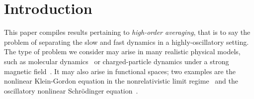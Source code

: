 













\section{Introduction}
\label{section:introduction}


This paper compiles results pertaining to \textit{high-order averaging},
that is to say the problem of separating the slow and fast dynamics in a
highly-oscillatory setting. The type of problem we consider may arise in
many realistic physical models, such as molecular
dynamics~\cite{garciaarchilla.1998.long} or charged-particle dynamics under a
strong magnetic field~\cite{chartier.2020.uniformly,
frenod.2009.long,frenod.2000.long}. It may also arise in functional
spaces; two examples are the nonlinear Klein-Gordon equation in the
nonrelativistic limit regime~\cite{bao.2014.uniformly,
bao.2019.comparison, chartier.2020.new} and the oscillatory nonlinear
Schrödinger equation~\cite{chartier.2015.uniformly,
castella.2015.stroboscopic}.


